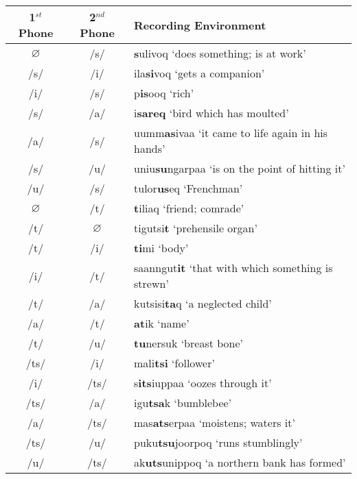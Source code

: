 \documentclass[12pt]{article}
\begin{document}
	\begin{tabular}{|c|c|l|}
	\hline
	1$^{st}$ Phone & 2$^{nd}$ Phone & Recording Environment \\
	\hline
	$\varnothing$ & /s/ & \textbf{s}ulivoq `does something; is at work'\\
	/s/ & /i/ & ila\textbf{si}voq `gets a companion'\\
	/i/ & /s/ & p\textbf{is}ooq `rich'\\
	/s/ & /a/ & i\textbf{sareq} `bird which has moulted'\\
	/a/ & /s/ & uumm\textbf{as}ivaa `it came to life again in his hands'\\
	/s/ & /u/ & uniu\textbf{su}ngarpaa `is on the point of hitting it'\\
	/u/ & /s/ & tulor\textbf{us}eq `Frenchman'\\
	$\varnothing$ & /t/ & \textbf{t}iliaq `friend; comrade'\\
	/t/ & $\varnothing$ & tigutsi\textbf{t} `prehensile organ'\\
	/t/ & /i/ & \textbf{ti}mi `body' \\
	/i/ & /t/ & saanngut\textbf{it} `that with which something is strewn'\\
	/t/ & /a/ & kutsisi\textbf{ta}q `a neglected child'\\
	/a/ & /t/ & \textbf{at}ik `name' \\
	/t/ & /u/ & \textbf{tu}nersuk `breast bone'\\
	/ts/ & /i/ & mali\textbf{tsi} `follower'\\
	/i/ & /ts/ & s\textbf{its}iuppaa `oozes through it'\\
	/ts/ & /a/ & igu\textbf{tsa}k `bumblebee'\\
	/a/ & /ts/ & mas\textbf{ats}erpaa `moistens; waters it'\\
	/ts/ & /u/ & puku\textbf{tsu}joorpoq `runs stumblingly'\\
	/u/ & /ts/ & ak\textbf{uts}unippoq `a northern bank has formed'\\
	\hline
	\end{tabular}
	\newpage
\end{document}
